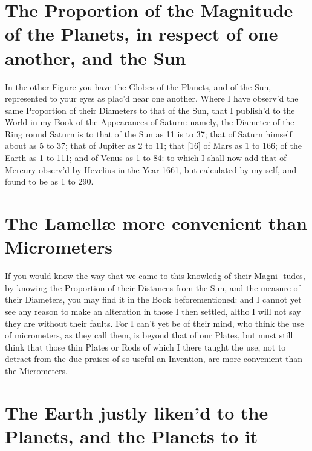 \documentclass[letterpaper]{book}
\begin{document}
\section{The Proportion of the Magnitude of the Planets, in
respect of one another, and the Sun}

In the other Figure you have the Globes of the Planets, and of the Sun,
represented to your eyes as plac'd near one another. Where I have observ'd
the same Proportion of their Diameters to that of the Sun, that I publish'd
to the World in my Book of the Appearances of Saturn: namely, the Diameter
of the Ring round Saturn is to that of the Sun as 11 is to 37; that of
Saturn himself about as 5 to 37; that of Jupiter as 2 to 11; that [16] of
Mars as 1 to 166; of the Earth as 1 to 111; and of Venus as 1 to 84: to
which I shall now add that of Mercury observ'd by Hevelius in the Year 1661,
but calculated by my self, and found to be as 1 to 290.


\section{The Lamellæ more convenient than Micrometers}

If you would know the way that we came to this knowledg of their Magni-
tudes, by knowing the Proportion of their Distances from the Sun, and the
measure of their Diameters, you may find it in the Book beforementioned:
and I cannot yet see any reason to make an alteration in those I then settled,
altho I will not say they are without their faults.
For I can't yet be of their mind, who think the use of micrometers, as
they call them, is beyond that of our Plates, but must still think that those
thin Plates or Rods of which I there taught the use, not to detract from
the due praises of so useful an Invention, are more convenient than the
Micrometers.


\section{The Earth justly liken'd to the Planets, and the
Planets to it}
\end{document}
